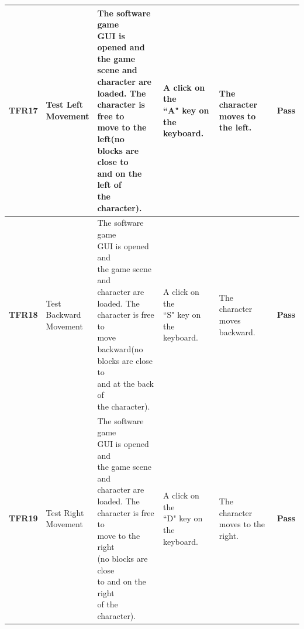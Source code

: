 \documentclass[12pt, titlepage]{article}
\begin{document}
\begin{center}
\begin{longtable}[!bpht]{|m{1.3cm}|m{2.3cm}|m{3.4cm}|m{3.4cm}|m{3.4cm}|m{1cm}|}
\textbf{TFR17} & \makecell[ml]{Test Left\\ Movement} & \makecell[ml]{The software game\\ GUI is opened and\\ the game scene and\\ character are\\ loaded. The\\ character is free to\\ 
move to the left(no\\ blocks are close to\\ and on the left of\\ the character).} & \makecell[ml]{A click on the\\ ``A" key on the\\ keyboard.} & \makecell[ml]{The character\\ moves to the left.} & \textbf{Pass}\\\hline

\textbf{TFR18} & \makecell[ml]{Test\\ Backward\\ Movement} & \makecell[ml]{The software game\\ GUI is opened and\\ the game scene and\\ character are\\ loaded. The\\ character is free to\\ move backward(no\\ blocks are close to\\ and at the back of\\ the character).} & \makecell[ml]{A click on the\\ ``S" key on the\\ keyboard.} & \makecell[ml]{The character\\ moves backward.} & \textbf{Pass}\\\hline

\textbf{TFR19} & \makecell[ml]{Test Right\\ Movement} & \makecell[ml]{The software game\\ GUI is opened and\\ the game scene and\\ character are\\ loaded. The\\ character is free to\\ move to the right\\(no blocks are close\\ to and on the right\\ of the character).} & \makecell[ml]{A click on the\\ ``D" key on the\\ keyboard.} & \makecell[ml]{The character \\moves to the right.} & \textbf{Pass}\\\hline


\end{longtable}
\end{center}
\end{document}
